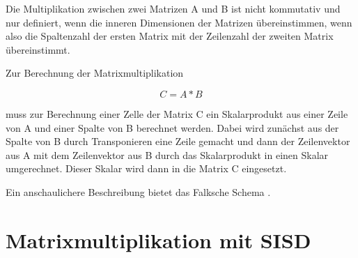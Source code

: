 Die Multiplikation zwischen zwei Matrizen A und B ist nicht kommutativ und nur definiert, wenn die inneren Dimensionen der Matrizen übereinstimmen, wenn also die Spaltenzahl der ersten Matrix mit der Zeilenzahl der zweiten Matrix übereinstimmt.

Zur Berechnung der Matrixmultiplikation

\begin{equation}
    C = A * B
\end{equation}

muss zur Berechnung einer Zelle der Matrix C ein Skalarprodukt aus einer Zeile von A und einer Spalte von B berechnet werden. Dabei wird zunächst aus der Spalte von B durch Transponieren eine Zeile gemacht und dann der Zeilenvektor aus A mit dem Zeilenvektor aus B durch das Skalarprodukt in einen Skalar umgerechnet. Dieser Skalar wird dann in die Matrix C eingesetzt.




Ein anschaulichere Beschreibung bietet das Falksche Schema \cite{Falk}.




\section{Matrixmultiplikation mit \gls{SISD}} \label{sec:matrix_mul_sisd}

